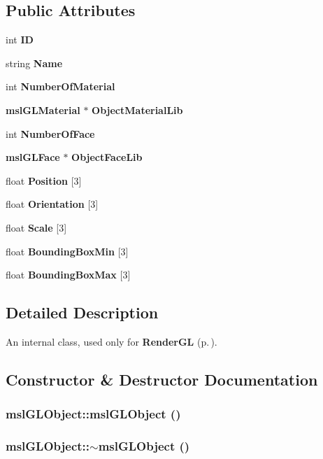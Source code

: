 \subsection*{Public Attributes}
\begin{CompactItemize}
\item 
int {\bf ID}
\item 
string {\bf Name}
\item 
int {\bf Number\-Of\-Material}
\item 
{\bf msl\-GLMaterial} $\ast$ {\bf Object\-Material\-Lib}
\item 
int {\bf Number\-Of\-Face}
\item 
{\bf msl\-GLFace} $\ast$ {\bf Object\-Face\-Lib}
\item 
float {\bf Position} [3]
\item 
float {\bf Orientation} [3]
\item 
float {\bf Scale} [3]
\item 
float {\bf Bounding\-Box\-Min} [3]
\item 
float {\bf Bounding\-Box\-Max} [3]
\end{CompactItemize}


\subsection{Detailed Description}
An internal class, used only for {\bf Render\-GL} {\rm (p.\,\pageref{classRenderGL})}.



\subsection{Constructor \& Destructor Documentation}
\subsubsection{\setlength{\rightskip}{0pt plus 5cm}msl\-GLObject::msl\-GLObject ()}\label{classmslGLObject_a0}


\subsubsection{\setlength{\rightskip}{0pt plus 5cm}msl\-GLObject::$\sim$msl\-GLObject ()}\label{classmslGLObject_a1}




